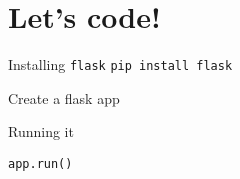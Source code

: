 \documentclass[../index.tex]{subfiles}
\begin{document}
\renewcommand{\sectiontitle}{Let's code!}
\section{\sectiontitle}

\renewcommand{\currenttitle}{Installing \texttt{flask}}
\begin{frame}{\currenttitle}
  \Large
  \texttt{pip install flask}
  \normalsize
\end{frame}

\renewcommand{\currenttitle}{Create a flask app}
\begin{frame}{\currenttitle}
\end{frame}

\renewcommand{\currenttitle}{Running it}
\begin{frame}[fragile]{\currenttitle}
  \begin{lstlisting}
app.run()
  \end{lstlisting}
\end{frame}
\end{document}
